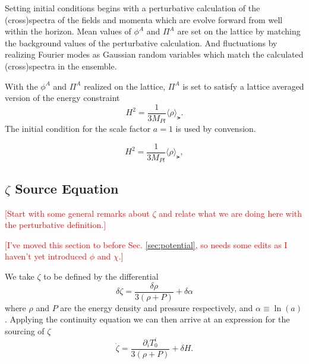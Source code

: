 Setting initial conditions begins with a perturbative calculation of the (cross)spectra of the fields and momenta which are evolve forward from well within the horizon.
Mean values of $\phi^A$ and $\Pi^A$ are set on the lattice by matching the background values of the perturbative calculation.
And fluctuations by realizing Fourier modes as Gaussian random variables which match the calculated (cross)spectra in the ensemble.

With the $\phi^A$ and $\Pi^A$ realized on the lattice, $\Pi^A$ is set to satisfy a lattice averaged version of the energy constraint
\begin{equation} \label{eq:energy constraint}
  H^2 = \frac{1}{3M_{Pl}}\langle \rho \rangle_\lat.
\end{equation}
The initial condition for the scale factor $a=1$ is used by convension.
  
\begin{equation} \label{eq:energy constraint}
  H^2 = \frac{1}{3M_{Pl}}\langle \rho \rangle_\lat,
\end{equation}

\subsection{$\zeta$ Source Equation}
\textcolor{[I haven't revised this section yet.]}

\textcolor{red}{[Start with some general remarks about $\zeta$ and relate what we are doing here with the perturbative definition.]}

\textcolor{red}{[I've moved this section to before Sec. \ref{sec:potential}, so needs some edits as I haven't yet introduced $\phi$ and $\chi$.]}

We take $\zeta$ to be defined by the differential
\begin{equation} \label{eq:zeta differential}
  \delta\zeta = \frac{\delta\rho}{3(\rho + P)} + \delta\alpha
\end{equation} 
where $\rho$ and $P$ are the energy density and pressure respectively, and $\alpha \equiv \ln(a)$.
Applying the continuity equation we can then arrive at an expression for the sourcing of $\zeta$
\begin{equation} \label{eq:zeta source T}
  \dot{\zeta} = \frac{\partial_iT^i_0}{3(\rho+P)} + \delta H. %
\end{equation}

